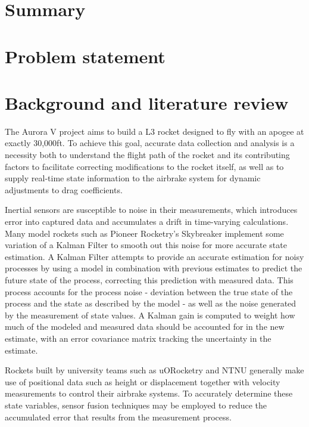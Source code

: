 \section{Summary}
\section{Problem statement}
\section{Background and literature review}
The Aurora V project aims to build a L3 rocket designed to fly with an apogee at exactly 30,000ft. To achieve this goal, accurate data collection and analysis is a necessity both to understand the flight path of the rocket and its contributing factors to facilitate correcting modifications to the rocket itself, as well as to supply real-time state information to the airbrake system for dynamic adjustments to drag coefficients.

Inertial sensors are susceptible to noise in their measurements, which introduces error into captured data and accumulates a drift in time-varying calculations. Many model rockets such as Pioneer Rocketry's Skybreaker\cite{pioneer-rocketry} implement some variation of a Kalman Filter to smooth out this noise for more accurate state estimation. A Kalman Filter attempts to provide an accurate estimation for noisy processes by using a model in combination with previous estimates to predict the future state of the process, correcting this prediction with measured data\cite{kalman-introduction,kalman1960}. This process accounts for the process noise - deviation between the true state of the process and the state as described by the model - as well as the noise generated by the measurement of state values. A Kalman gain is computed to weight how much of the modeled and measured data should be accounted for in the new estimate, with an error covariance matrix tracking the uncertainty in the estimate.

Rockets built by university teams such as uORocketry and NTNU generally make use of positional data such as height or displacement together with velocity measurements to control their airbrake systems\cite{uORocketry, NTNU}. To accurately determine these state variables, sensor fusion techniques may be employed to reduce the accumulated error that results from the measurement process. 

